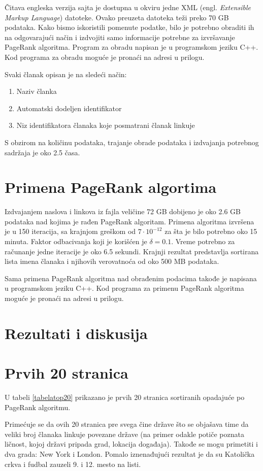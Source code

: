 \documentclass[12pt, journal, compsoc]{IEEEtran}
\begin{document}
Čitava engleska verzija sajta je dostupna u okviru jedne XML (engl. \textit{Extensible Markup Language}) datoteke. Ovako preuzeta datoteka teži preko 70 GB podataka. Kako bismo iskoristili pomenute podatke, bilo je potrebno obraditi ih na odgovarajući način i izdvojiti samo informacije potrebne za izvršavanje PageRank algoritma. Program za obradu napisan je u programskom jeziku C++. Kod programa za obradu moguće je pronaći na adresi u prilogu.

Svaki članak opisan je na sledeći način:
\begin{enumerate}
    \item Naziv članka
    \item Automatski dodeljen identifikator
    \item Niz identifikatora članaka koje posmatrani članak linkuje
\end{enumerate}

S obzirom na količinu podataka, trajanje obrade podataka i izdvajanja potrebnog sadržaja je oko 2.5 časa.

\section{Primena PageRank algortima}
Izdvajanjem naslova i linkova iz fajla veličine 72 GB dobijeno je oko 2.6 GB podataka nad kojima je rađen PageRank algoritam.
Primena algoritma izvršena je u 150 iteracija, sa krajnjom greškom od $7 \cdot 10^{-12}$ za šta je bilo potrebno oko 15 minuta. Faktor odbacivanja koji je korišćen je $\delta = 0.1$. Vreme potrebno za računanje jedne iteracije je oko 6.5 sekundi.
Krajnji rezultat predstavlja sortirana lista imena članaka i njihovih verovatnoća od oko 500 MB podataka.

Sama primena PageRank algoritma nad obrađenim podacima takođe je napisana u programskom jeziku C++. Kod programa za primenu PageRank algoritma moguće je pronaći na adresi u prilogu.

\section{Rezultati i diskusija}
\section*{Prvih 20 stranica}
U tabeli \ref{tabelatop20} prikazano je prvih 20 stranica sortiranih opadajuće po PageRank algoritmu.

Primećuje se da ovih 20 stranica pre svega čine države što se objašava time da veliki broj članaka linkuje povezane države (na primer odakle potiče poznata ličnost, kojoj državi pripada grad, lokacija događaja). Takođe se mogu primetiti i dva grada: New York i London. Pomalo iznenađujući rezultat je da su Katolička crkva i fudbal zauzeli  9. i 12. mesto na listi. 
\end{document}
